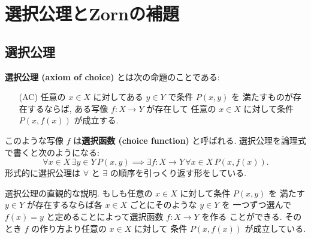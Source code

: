 \documentclass[12pt,twoside]{jarticle}
\newcommand\commentout[1]{#1}
\newcommand\commentout[1]{}
\begin{document}





\section{選択公理とZornの補題}




\subsection{選択公理}

{\bf 選択公理 (axiom of choice)} とは次の命題のことである:
\begin{itemize}
\item[(AC)] 任意の $x\in X$ に対してある $y\in Y$ で条件 $P(x,y)$ を
  満たすものが存在するならば, 
  ある写像 $f:X\to Y$ が存在して
  任意の $x\in X$ に対して条件 $P(x,f(x))$ が成立する.
\end{itemize}
このような写像 $f$ は{\bf 選択函数 (choice function)} と呼ばれる.
選択公理を論理式で書くと次のようになる:
\begin{equation*}
  \forall x\in X\, \exists y\in Y\, P(x,y)
  \implies
  \exists f:X\to Y\, \forall x\in X\, P(x,f(x)).
\end{equation*}
形式的に選択公理は $\forall$ と $\exists$ の順序を引っくり返す形をしている.

選択公理の直観的な説明. もしも任意の $x\in X$ に対して条件 $P(x,y)$ を
満たす $y\in Y$ が存在するならば各 $x\in X$ ごとにそのような $y\in Y$ を
一つずつ選んで $f(x)=y$ と定めることによって選択函数 $f:X\to Y$ を作る
ことができる. そのとき $f$ の作り方より任意の $x\in X$ に対して
条件 $P(x,f(x))$ が成立している.
\end{document}

